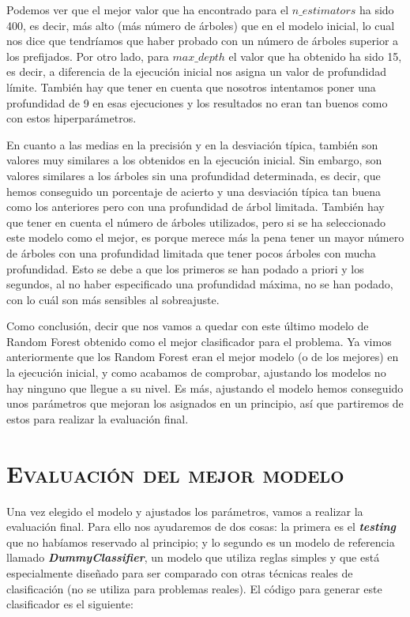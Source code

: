 \documentclass[11pt,a4paper]{article}
\begin{document}
Podemos ver que el mejor valor que ha encontrado para el $n\_estimators$ ha sido 400, es decir, más alto (más número de árboles) que en el
modelo inicial, lo cual nos dice que tendríamos que haber probado con un número de árboles superior a  los prefijados. Por otro lado, para
$max\_depth$ el valor que ha obtenido ha sido 15, es decir, a diferencia de la ejecución inicial nos asigna un valor de profundidad límite.
También hay que tener en cuenta que nosotros intentamos poner una profundidad de 9 en esas ejecuciones y los resultados no eran tan buenos
como con estos hiperparámetros.

En cuanto a las medias en la precisión y en la desviación típica, también son valores muy similares a los obtenidos en la ejecución
inicial. Sin embargo, son valores similares a los árboles sin una profundidad determinada, es decir, que hemos conseguido un porcentaje de
acierto y una desviación típica tan buena como los anteriores pero con una profundidad de árbol limitada. También hay que tener en cuenta
el número de árboles utilizados, pero si se ha seleccionado este modelo como el mejor, es porque merece más la pena tener un mayor número
de árboles con una profundidad limitada que tener pocos árboles con mucha profundidad. Esto se debe a que los primeros se han podado a
priori y los segundos, al no haber especificado una profundidad máxima, no se han podado, con lo cuál son más sensibles al sobreajuste.

Como conclusión, decir que nos vamos a quedar con este último modelo de Random Forest obtenido como el mejor clasificador para el problema.
Ya vimos anteriormente que los Random Forest eran el mejor modelo (o de los mejores) en la ejecución inicial, y como acabamos de comprobar,
ajustando los modelos no hay ninguno que llegue a su nivel. Es más, ajustando el modelo hemos conseguido unos parámetros que mejoran los
asignados en un principio, así que partiremos de estos para realizar la evaluación final.

\section{\textsc{Evaluación del mejor modelo}}

Una vez elegido el modelo y ajustados los parámetros, vamos a realizar la evaluación final. Para ello nos ayudaremos de dos cosas: la primera es el \textbf{\textit{testing}} que no habíamos reservado al principio; y lo segundo es un modelo de referencia llamado \textbf{\textit{DummyClassifier}}\cite{DummyClassifier}, un modelo que utiliza reglas simples y que está especialmente diseñado para ser comparado con otras técnicas reales de clasificación (no se utiliza para problemas reales). El código para generar este clasificador es el siguiente:
\end{document}
